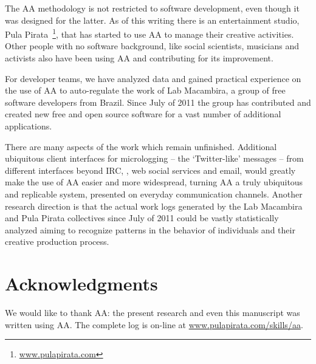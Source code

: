 \documentclass[letterpaper]{article}
\begin{document}
The AA methodology is not restricted to software development, even though it was
designed for the latter. As of this
writing there is an entertainment studio, Pula Pirata~\footnote{
\url{www.pulapirata.com}}, that has started to use AA to manage their creative activities.
Other people with no software background, like social scientists, musicians and
activists also have been using AA and contributing for its improvement.

For developer teams, we have analyzed data and gained practical experience on
the use of AA to auto-regulate the work of Lab Macambira, a group of free
software developers from Brazil. Since July of 2011 the group has contributed
and created new free and open source software for a vast number of additional applications.

There are many aspects of the work which remain unfinished. Additional
ubiquitous client
interfaces for micrologging -- the `Twitter-like' messages -- from different
interfaces beyond IRC, \eg, web social services and email, would greatly make the use of
AA easier and more widespread, turning AA a truly ubiquitous and replicable system, presented on everyday
communication channels. Another research direction is that the actual work logs
generated by the Lab Macambira and Pula Pirata collectives since July of 2011
could be vastly statistically analyzed aiming to recognize patterns in the
behavior of individuals and their creative production process.

\section*{Acknowledgments}

We would like to thank AA: the present research and even this
manuscript was written using AA. The complete log is on-line at
\url{www.pulapirata.com/skills/aa}.

\nocite{last2003}
\nocite{german2003}
\nocite{carmel1999}
\nocite{carmel2001}
\nocite{komi2005}
\nocite{battin2001}

%
%


\end{document}
